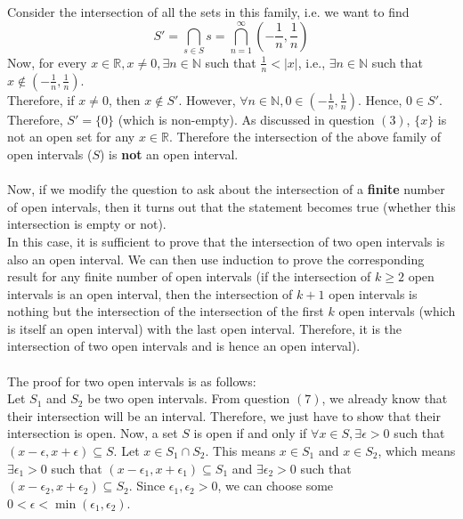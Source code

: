 \documentclass{article}
\begin{document}
\begin{enumerate}
	Consider the intersection of all the sets in this family, i.e. we want to find
	\begin{equation*}
		S' = \bigcap_{s \in S} s = \bigcap_{n = 1}^{\infty} (-\frac{1}{n}, \frac{1}{n})
	\end{equation*}
	Now, for every $x \in \mathbb{R}, x \neq 0, \exists n \in \mathbb{N}$ such that $\frac{1}{n} < |x|$, i.e., $\exists n \in \mathbb{N}$ such that $x \notin (-\frac{1}{n}, \frac{1}{n})$.
	\\Therefore, if $x \neq 0$, then $x \notin S'$.
	However, $\forall n \in \mathbb{N}, 0 \in (-\frac{1}{n}, \frac{1}{n})$. Hence, $0 \in S'$.
	\\Therefore, $S' = \{0\}$ (which is non-empty). As discussed in question $(3)$, $\{x\}$ is not an open set for any $x \in \mathbb{R}$. Therefore the intersection of the above family of open intervals ($S$) is \textbf{not} an open interval.
	\\\\Now, if we modify the question to ask about the intersection of a \textbf{finite} number of open intervals, then it turns out that the statement becomes true (whether this intersection is empty or not).
	\\In this case, it is sufficient to prove that the intersection of two open intervals is also an open interval. We can then use induction to prove the corresponding result for any finite number of open intervals
	(if the intersection of $k \geq 2$ open intervals is an open interval, then the intersection of $k+1$ open intervals is nothing but the intersection of the intersection of the first $k$ open intervals (which is itself an open interval) with the last open interval. Therefore, it is the intersection of two open intervals and is hence an open interval).
	\\\\The proof for two open intervals is as follows:
	\\Let $S_{1}$ and $S_{2}$ be two open intervals. From question $(7)$, we already know that their intersection will be an interval. Therefore, we just have to show that their intersection is open.
	Now, a set $S$ is open if and only if $\forall x \in S, \exists \epsilon > 0$ such that $(x - \epsilon, x + \epsilon) \subseteq S$. Let $x \in S_{1} \cap S_{2}$. This means $x \in S_{1}$ and $x \in S_{2}$, which means
	$\exists \epsilon_{1} > 0$ such that $(x - \epsilon_{1}, x + \epsilon_{1}) \subseteq S_{1}$ and $\exists \epsilon_{2} > 0$ such that $(x - \epsilon_{2}, x + \epsilon_{2}) \subseteq S_{2}$. Since $\epsilon_{1}, \epsilon_{2} > 0$, we can choose some $0 < \epsilon < \min(\epsilon_{1}, \epsilon_{2})$.

\end{enumerate}
\end{document}
